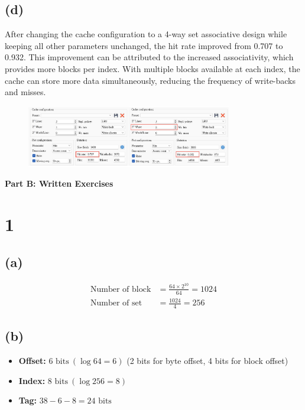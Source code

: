 \documentclass[12pt]{article}
\begin{document}
\subsection*{(d)}

After changing the cache configuration to a 4-way set associative design while keeping all other parameters unchanged, the hit rate improved from 0.707 to 0.932. This improvement can be attributed to the increased associativity, which provides more blocks per index. With multiple blocks available at each index, the cache can store more data simultaneously, reducing the frequency of write-backs and misses.

\begin{figure}[h!]
    \centering
    \includegraphics[width=0.8\textwidth]{./img/qd.png}
\end{figure}

\clearpage

\begin{center}
    \large \textbf{Part B: Written Exercises}
\end{center}

\section*{1}

\subsection*{(a)}

\begin{align*}
    \text{Number of block} &= \frac{64 \times 2^{10}}{64} = 1024 \\
    \text{Number of set} &= \frac{1024}{4} = 256
\end{align*}

\subsection*{(b)}

\begin{itemize}
    \item \textbf{Offset:} $6 \text{ bits} \ (\log 64 = 6)$ (2 bits for byte offset, 4 bits for block offset)
    \item \textbf{Index:} $8 \text{ bits} \ (\log 256 = 8)$
    \item \textbf{Tag:} $38 - 6 - 8 = 24 \text{ bits}$
\end{itemize}
\end{document}
